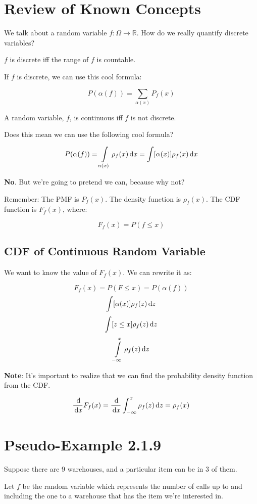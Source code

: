 \documentclass{article}
\renewcommand{\d}[1]{\,\textnormal{d}#1}
\newcommand{\dd}[2]{\frac{\d{#1}}{\d{#2}}}
\begin{document}
\section*{Review of Known Concepts}

We talk about a random variable $f:\Omega\rightarrow\mathbb{R}$. How
do we really quantify discrete variables?

$f$ is discrete iff the range of $f$ is countable.

If $f$ is discrete, we can use this cool formula:

\[
P(\alpha(f))=\sum\limits_{\alpha(x)}P_f(x)
\]

A random variable, $f$, is continuous iff $f$ is not discrete.

Does this mean we can use the following cool formula?

\[
P(\alpha(f))=\int\limits_{\alpha(x)}\rho_f(x)\d{x} = \int\lbrack\alpha(x)\rbrack\rho_f(x)\d{x}
\]

\textbf{No}. But we're going to pretend we can, because why not?

Remember: The PMF is $P_f(x)$. The density function is
$\rho_f(x)$. The CDF function is $F_f(x)$, where:

\[
F_f(x)=P(f\le x)
\]

\subsection*{CDF of Continuous Random Variable}

We want to know the value of $F_f(x)$. We can rewrite it as:

\[
F_f(x)=P(F\le x)=P(\alpha(f))
\] \[
\int\lbrack\alpha(x)\rbrack\rho_f(z)\d{z}
\] \[
\int\lbrack z\le x\rbrack\rho_f(z)\d{z}
\] \[
\int\limits_{-\infty}^x\rho_f(z)\d{z}
\]

\textbf{Note}: It's important to realize that we can find the
probability density function from the CDF.

\[
\dd{}{x}F_f(x)=\dd{}{x}\int_{-\infty}^x\rho_f(z)\d{z}=\rho_f(x)
\]

\section*{Pseudo-Example 2.1.9}

Suppose there are 9 warehouses, and a particular item can be in 3 of
them.

Let $f$ be the random variable which represents the number of calls up
to and including the one to a warehouse that has the item we're
interested in.
\end{document}
